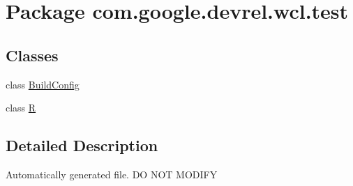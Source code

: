 \hypertarget{namespacecom_1_1google_1_1devrel_1_1wcl_1_1test}{}\section{Package com.\+google.\+devrel.\+wcl.\+test}
\label{namespacecom_1_1google_1_1devrel_1_1wcl_1_1test}
\subsection*{Classes}
\begin{DoxyCompactItemize}
\item 
class \hyperlink{classcom_1_1google_1_1devrel_1_1wcl_1_1test_1_1BuildConfig}{Build\+Config}
\item 
class \hyperlink{classcom_1_1google_1_1devrel_1_1wcl_1_1test_1_1R}{R}
\end{DoxyCompactItemize}


\subsection{Detailed Description}
Automatically generated file. DO N\+OT M\+O\+D\+I\+FY 